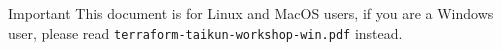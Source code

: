 \begin{important}{Important}
  This document is for Linux and MacOS users, if you are a Windows user, please read \texttt{terraform-taikun-workshop-win.pdf} instead.
\end{important}
